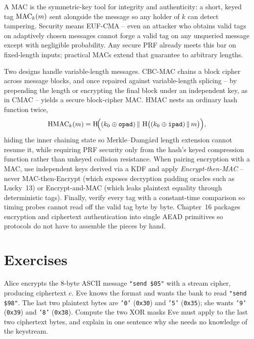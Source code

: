 A MAC is the symmetric-key tool for integrity and authenticity: a short, keyed tag $\operatorname{MAC}_k(m)$ sent alongside the message so any holder of $k$ can detect tampering. Security means EUF-CMA -- even an attacker who obtains valid tags on adaptively chosen messages cannot forge a valid tag on any unqueried message except with negligible probability. Any secure PRF already meets this bar on fixed-length inputs; practical MACs extend that guarantee to arbitrary lengths.

Two designs handle variable-length messages. CBC-MAC chains a block cipher across message blocks, and once repaired against variable-length splicing -- by prepending the length or encrypting the final block under an independent key, as in CMAC -- yields a secure block-cipher MAC. HMAC nests an ordinary hash function twice,
\[
  \mathrm{HMAC}_k(m) = \operatorname{H}\!\Bigl((k_0\oplus\texttt{opad}) \,\|\, \operatorname{H}\bigl((k_0\oplus\texttt{ipad})\,\|\, m\bigr)\Bigr),
\]
hiding the inner chaining state so Merkle--Damg\aa{}rd length extension cannot resume it, while requiring PRF security only from the hash's keyed compression function rather than unkeyed collision resistance. When pairing encryption with a MAC, use independent keys derived via a KDF and apply \emph{Encrypt-then-MAC} -- never MAC-then-Encrypt (which exposes decryption padding oracles such as Lucky~13) or Encrypt-and-MAC (which leaks plaintext equality through deterministic tags). Finally, verify every tag with a constant-time comparison so timing probes cannot read off the valid tag byte by byte. Chapter~16 packages encryption and ciphertext authentication into single AEAD primitives so protocols do not have to assemble the pieces by hand.

\section*{Exercises}

\begin{exercise}
Alice encrypts the 8-byte ASCII message \texttt{"send \$05"} with a stream cipher, producing ciphertext $c$. Eve knows the format and wants the bank to read \texttt{"send \$98"}. The last two plaintext bytes are \texttt{'0'} (\texttt{0x30}) and \texttt{'5'} (\texttt{0x35}); she wants \texttt{'9'} (\texttt{0x39}) and \texttt{'8'} (\texttt{0x38}). Compute the two XOR masks Eve must apply to the last two ciphertext bytes, and explain in one sentence why she needs no knowledge of the keystream.
\end{exercise}

